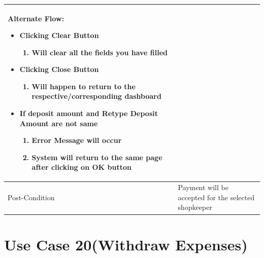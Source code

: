 \documentclass[12pt,a4paper]{report}
\begin{document}
\begin{tabular}{ | m{3cm} | m{12cm}| }
Alternate Flow:

\begin{itemize}
\item 	Clicking Clear Button
	\begin{enumerate}
		\item Will clear all the fields you have filled
	\end{enumerate}
\item Clicking Close Button
	\begin{enumerate}
	   	 \item	Will happen to return to the respective/corresponding dashboard
	\end{enumerate}
\item If deposit amount and Retype Deposit Amount are not same
	\begin{enumerate}
		\item Error Message will occur
		\item System will return to the same page after clicking on OK button
	\end{enumerate}
\end{itemize}
\\ \hline
Post-Condition &   Payment will be accepted for the selected shopkeeper  \\ \hline

\end{tabular}
\section{Use Case 20(Withdraw Expenses) }
\end{document}
